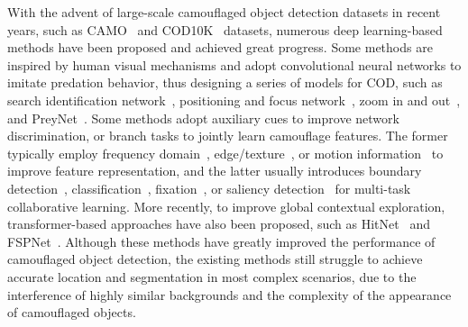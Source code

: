 \documentclass{ecai}
\begin{document}
With the advent of large-scale camouflaged object detection datasets in recent years, such as CAMO~\cite{le2019anabranch} and COD10K~\cite{fan2020camouflaged} datasets, numerous deep learning-based methods have been proposed and achieved great progress. Some methods are inspired by human visual mechanisms and adopt convolutional neural networks to imitate predation behavior, thus designing a series of models for COD, such as search identification network~\cite{fan2021concealed}, positioning and focus network~\cite{mei2021camouflaged}, zoom in and out~\cite{pang2020multi}, and PreyNet~\cite{zhang2022preynet}. Some methods adopt auxiliary cues to improve network discrimination, or branch tasks to jointly learn camouflage features. The former typically employ frequency domain~\cite{zhong2022detecting}, edge/texture~\cite{ji2022gradient, zhu2021inferring}, or motion information~\cite{cheng2022implicit} to improve feature representation, and the latter usually introduces boundary detection~\cite{sun2022boundary}, classification~\cite{le2019anabranch}, fixation~\cite{lv2021simultaneously}, or saliency detection~\cite{li2021uncertainty} for multi-task collaborative learning. More recently, to improve global contextual exploration, transformer-based approaches have also been proposed, such as HitNet~\cite{hu2022high} and FSPNet~\cite{huang2023feature}. Although these methods have greatly improved the performance of camouflaged object detection, the existing methods still struggle to achieve accurate location and segmentation in most complex scenarios, due to the interference of highly similar backgrounds and the complexity of the appearance of camouflaged objects. 


\end{document}
